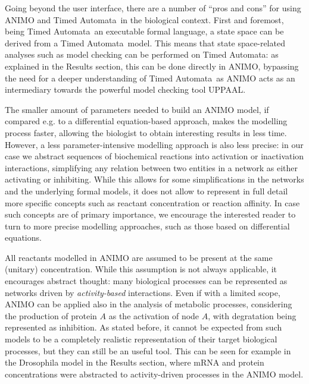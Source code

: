 \documentclass{bmcart}
\def\tas{Timed Automata}
\begin{document}
Going beyond the user interface, there are a number of ``pros and cons'' for using ANIMO and \tas\ 
in the biological context. First and foremost, being \tas\ an executable formal language,
a state space can be derived from a \tas\ model. This means that state space-related analyses
such as model checking can be performed on \tas: as explained in the Results section, this can
be done directly in ANIMO, bypassing the need for a deeper understanding of \tas\ as
ANIMO acts as an intermediary towards the powerful model checking tool UPPAAL.

The smaller amount of parameters needed to build an ANIMO model, if compared e.g. to
a differential equation-based approach, makes the modelling process faster, allowing
the biologist to obtain interesting results in less time. However, a less
parameter-intensive modelling approach is also less precise: in our case we abstract
sequences of biochemical reactions into activation or inactivation interactions,
simplifying any relation between two entities in a network as either activating or
inhibiting. While this allows for some simplifications in the networks and the underlying
formal models, it does not allow to represent in full detail more specific concepts
such as reactant concentration or reaction affinity. In case such concepts are of
primary importance, we encourage the interested reader to turn to more precise
modelling approaches, such as those based on differential equations.

All reactants modelled in ANIMO are assumed to be present at the same
(unitary) concentration. While this assumption is not always applicable, it encourages
abstract thought: many biological processes can be represented as networks driven by
\emph{activity-based} interactions. Even if with a limited scope, ANIMO can be applied
also in the analysis of metabolic processes, considering the production of protein $A$ as
the activation of node $A$, with degratation being represented as inhibition. As stated before,
it cannot be expected from such models to be a completely realistic representation of their target biological
processes, but they can still be an useful tool. This can be seen for example in the Drosophila
model in the Results section, where mRNA and protein concentrations were abstracted to
activity-driven processes in the ANIMO model.
\end{document}
